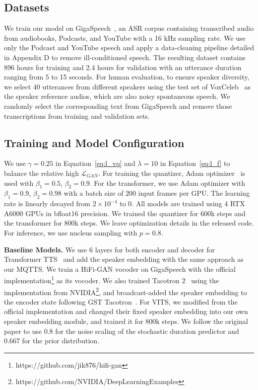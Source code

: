 \documentclass[letterpaper]{article} %
\begin{document}
\subsection{Datasets}
\label{ssec:data}
We train our model on GigaSpeech~\cite{GigaSpeech2021}, an ASR corpus containing transcribed audio from audiobooks, Podcasts, and YouTube with a 16 kHz sampling rate.
We use only the Podcast and YouTube speech and apply a data-cleaning pipeline detailed in Appendix D to remove ill-conditioned speech.
The resulting dataset contains 896 hours for training and 2.4 hours for validation with an utterance duration ranging from 5 to 15 seconds.
For human evaluation, to ensure speaker diversity, we select 40 utterances from different speakers using the test set of VoxCeleb~\cite{Nagrani19} as the speaker reference audios, which are also noisy spontaneous speech.
We randomly select the corresponding text from GigaSpeech and remove those transcriptions from training and validation sets.

\subsection{Training and Model Configuration}
We use $\gamma = 0.25$ in Equation~\ref{eq:l_vq} and $\lambda = 10$ in Equation~\ref{eq:l_f} to balance the relative high $\mathcal{L}_{GAN}$.
For training the quantizer, Adam optimizer~\cite{kingma2014adam} is used with $\beta_1 = 0.5$, $\beta_2 = 0.9$.
For the transformer, we use Adam optimizer with $\beta_1 = 0.9$, $\beta_2 = 0.98$ with a batch size of $200$ input frames per GPU.
The learning rate is linearly decayed from $2\times 10^{-4}$ to $0$.
All models are trained using 4 RTX A6000 GPUs in bfloat16 precision.
We trained the quantizer for 600k steps and the transformer for 800k steps.
We leave optimization details in the released code.
For inference, we use nucleus sampling with $p=0.8$.

\textbf{Baseline Models.}
We use 6 layers for both encoder and decoder for Transformer TTS~\cite{Li_Liu_Liu_Zhao_Liu_2019} and add the speaker embedding with the same approach as our MQTTS.
We train a HiFi-GAN vocoder on GigaSpeech with the official implementation\footnote{https://github.com/jik876/hifi-gan} as its vocoder.
We also trained Tacotron 2~\cite{8461368} using the implementation from NVIDIA\footnote{https://github.com/NVIDIA/DeepLearningExamples}, and broadcast-added the speaker embedding to the encoder state following GST Tacotron~\cite{Wang2018StyleTU}.
For VITS, we modified from the official implementation and changed their fixed speaker embedding into our own speaker embedding module, and trained it for 800k steps.
We follow the original paper to use $0.8$ for the noise scaling of the stochastic duration predictor and $0.667$ for the prior distribution.
\end{document}
